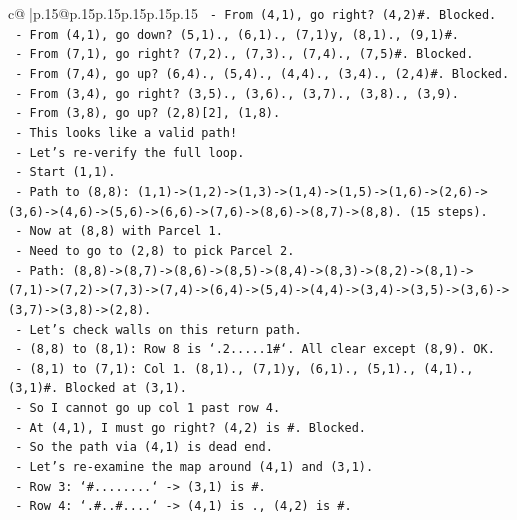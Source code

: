 \documentclass{article}
\begin{document}
{\begin{supertabular}{c@{$\;$}|p{.15\linewidth}@{}p{.15\linewidth}p{.15\linewidth}p{.15\linewidth}p{.15\linewidth}p{.15\linewidth}}
{{{\texttt{    {-} From (4,1), go right? (4,2)\#. Blocked.} \\
\texttt{    {-} From (4,1), go down? (5,1)., (6,1)., (7,1)y, (8,1)., (9,1)\#.} \\
\texttt{    {-} From (7,1), go right? (7,2)., (7,3)., (7,4)., (7,5)\#. Blocked.} \\
\texttt{    {-} From (7,4), go up? (6,4)., (5,4)., (4,4)., (3,4)., (2,4)\#. Blocked.} \\
\texttt{    {-} From (3,4), go right? (3,5)., (3,6)., (3,7)., (3,8)., (3,9).} \\
\texttt{    {-} From (3,8), go up? (2,8){[}2{]}, (1,8).} \\
\texttt{    {-} This looks like a valid path!} \\
\texttt{    {-} Let's re{-}verify the full loop.} \\
\texttt{    {-} Start (1,1).} \\
\texttt{    {-} Path to (8,8): (1,1){-}>(1,2){-}>(1,3){-}>(1,4){-}>(1,5){-}>(1,6){-}>(2,6){-}>(3,6){-}>(4,6){-}>(5,6){-}>(6,6){-}>(7,6){-}>(8,6){-}>(8,7){-}>(8,8). (15 steps).} \\
\texttt{    {-} Now at (8,8) with Parcel 1.} \\
\texttt{    {-} Need to go to (2,8) to pick Parcel 2.} \\
\texttt{    {-} Path: (8,8){-}>(8,7){-}>(8,6){-}>(8,5){-}>(8,4){-}>(8,3){-}>(8,2){-}>(8,1){-}>(7,1){-}>(7,2){-}>(7,3){-}>(7,4){-}>(6,4){-}>(5,4){-}>(4,4){-}>(3,4){-}>(3,5){-}>(3,6){-}>(3,7){-}>(3,8){-}>(2,8).} \\
\texttt{    {-} Let's check walls on this return path.} \\
\texttt{      {-} (8,8) to (8,1): Row 8 is `.2.....1\#`. All clear except (8,9). OK.} \\
\texttt{      {-} (8,1) to (7,1): Col 1. (8,1)., (7,1)y, (6,1)., (5,1)., (4,1)., (3,1)\#. Blocked at (3,1).} \\
\texttt{      {-} So I cannot go up col 1 past row 4.} \\
\texttt{      {-} At (4,1), I must go right? (4,2) is \#. Blocked.} \\
\texttt{      {-} So the path via (4,1) is dead end.} \\
\texttt{    {-} Let's re{-}examine the map around (4,1) and (3,1).} \\
\texttt{      {-} Row 3: `\#........` {-}> (3,1) is \#.} \\
\texttt{      {-} Row 4: `.\#..\#....` {-}> (4,1) is ., (4,2) is \#.} \\
}}}
\end{supertabular}}
\end{document}
